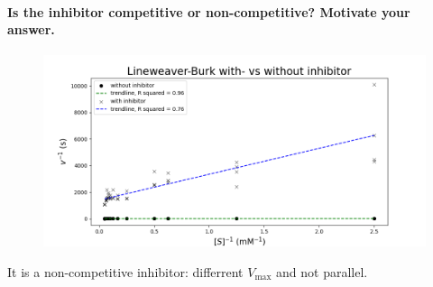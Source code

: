 \documentclass[a4paper,12pt]{article}
\begin{document}
\paragraph{Is the inhibitor competitive or non-competitive? Motivate your answer.}

\begin{figure}[htb]
    \includegraphics[scale=0.4]{fig3_6.png}
    \centering
\end{figure}

It is a non-competitive inhibitor: differrent $V_{\text{max}}$ and not parallel.
\end{document}
